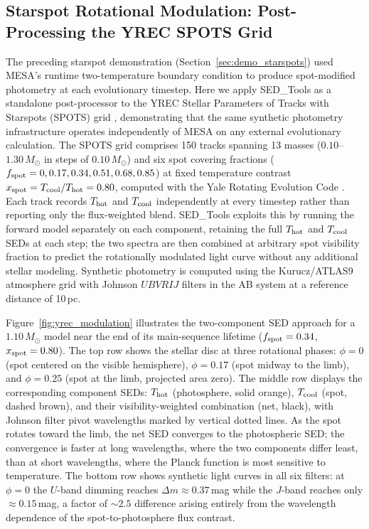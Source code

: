 \documentclass[linenumbers,apj,twocolumn, floatfix]{aastex701}
\begin{document}
\subsection{Starspot Rotational Modulation: Post-Processing the YREC SPOTS Grid}
\label{sec:demo_yrec}

The preceding starspot demonstration (Section~\ref{sec:demo_starspots}) used MESA's runtime two-temperature boundary condition to produce spot-modified photometry at each evolutionary timestep.
Here we apply SED\_Tools as a standalone post-processor to the YREC Stellar Parameters of Tracks with Starspots (SPOTS) grid \citep{Somers2020}, demonstrating that the same synthetic photometry infrastructure operates independently of MESA on any external evolutionary calculation.
The SPOTS grid comprises 150 tracks spanning 13 masses ($0.10$--$1.30\,M_\odot$ in steps of $0.10\,M_\odot$) and six spot covering fractions ($f_{\rm spot} = 0, 0.17, 0.34, 0.51, 0.68, 0.85$) at fixed temperature contrast $x_{\rm spot} = T_{\rm cool}/T_{\rm hot} = 0.80$, computed with the Yale Rotating Evolution Code \citep{vanSaders2013}.
Each track records $T_{\rm hot}$ and $T_{\rm cool}$ independently at every timestep rather than reporting only the flux-weighted blend.
SED\_Tools exploits this by running the forward model separately on each component, retaining the full $T_{\rm hot}$ and $T_{\rm cool}$ SEDs at each step; the two spectra are then combined at arbitrary spot visibility fraction to predict the rotationally modulated light curve without any additional stellar modeling.
Synthetic photometry is computed using the Kurucz/ATLAS9 atmosphere grid with Johnson $UBVRIJ$ filters in the AB system at a reference distance of 10\,pc.

Figure~\ref{fig:yrec_modulation} illustrates the two-component SED approach for a $1.10\,M_\odot$ model near the end of its main-sequence lifetime ($f_{\rm spot} = 0.34$, $x_{\rm spot} = 0.80$).
The top row shows the stellar disc at three rotational phases: $\phi = 0$ (spot centered on the visible hemisphere), $\phi = 0.17$ (spot midway to the limb), and $\phi = 0.25$ (spot at the limb, projected area zero).
The middle row displays the corresponding component SEDs: $T_{\rm hot}$ (photosphere, solid orange), $T_{\rm cool}$ (spot, dashed brown), and their visibility-weighted combination (net, black), with Johnson filter pivot wavelengths marked by vertical dotted lines.
As the spot rotates toward the limb, the net SED converges to the photospheric SED; the convergence is faster at long wavelengths, where the two components differ least, than at short wavelengths, where the Planck function is most sensitive to temperature.
The bottom row shows synthetic light curves in all six filters: at $\phi = 0$ the $U$-band dimming reaches $\Delta m \approx 0.37$\,mag while the $J$-band reaches only $\approx 0.15$\,mag, a factor of $\sim 2.5$ difference arising entirely from the wavelength dependence of the spot-to-photosphere flux contrast.
\end{document}
